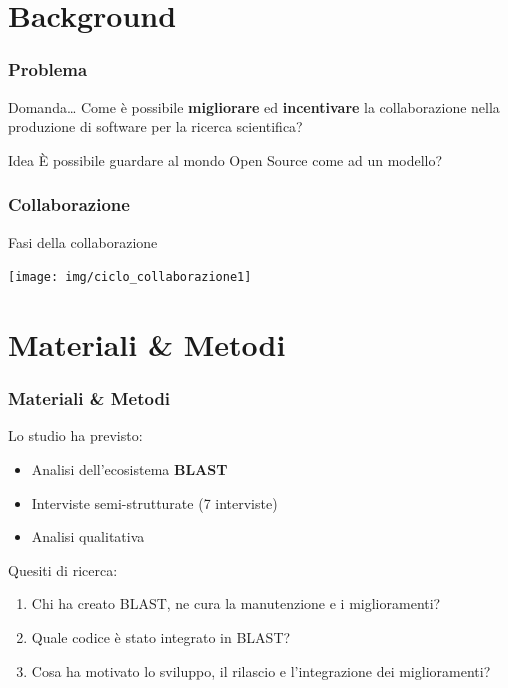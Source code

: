 \section{Background}

\begin{frame}\frametitle{Problema}

\begin{block}{Domanda\dots}
\Large{Come è possibile \textbf{migliorare} ed \textbf{incentivare} la collaborazione nella produzione di software per la ricerca scientifica?}
\end{block}

\begin{exampleblock}{Idea}
\Large{È possibile guardare al mondo Open Source come ad un modello?}
\end{exampleblock}

\end{frame}

\begin{frame}\frametitle{Collaborazione}

\begin{center}
\Large{Fasi della collaborazione}
\end{center}

\vspace{.5cm}

\begin{center}
    \texttt{[image: img/ciclo\_collaborazione1]}
\end{center}

\end{frame}

\section{Materiali \& Metodi}

\begin{frame}\frametitle{Materiali \& Metodi}

\Large{Lo studio ha previsto:}

\begin{itemize}[<+->]
\itemsep1pt\parskip0pt
\item
  Analisi dell'ecosistema \alert{\textbf{BLAST}}
\item
  Interviste semi-strutturate (7 interviste)
\item
  Analisi qualitativa
\end{itemize}

\Large{Quesiti di ricerca:}

\begin{enumerate}[<+->]
\def\labelenumi{\arabic{enumi}.}
\itemsep1pt\parskip0pt
\item
  Chi ha creato BLAST, ne cura la manutenzione e i miglioramenti?
\item
  Quale codice è stato integrato in BLAST?
\item
  Cosa ha motivato lo sviluppo, il rilascio e l'integrazione dei
  miglioramenti?
\end{enumerate}

\end{frame}

